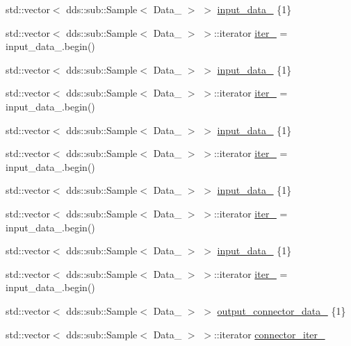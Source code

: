 \begin{DoxyCompactItemize}
\item 
std\+::vector$<$ dds\+::sub\+::\+Sample$<$ Data\+\_ $>$ $>$ \hyperlink{classFactory_a126e4ae222ac36e61cb29c93d7b375b3}{input\+\_\+data\+\_} \{1\}
\item 
std\+::vector$<$ dds\+::sub\+::\+Sample$<$ Data\+\_ $>$ $>$\+::iterator \hyperlink{classFactory_afe81300eda34ff9d60fc4f243b94534d}{iter\+\_} = input\+\_\+data\+\_.\+begin()
\item 
std\+::vector$<$ dds\+::sub\+::\+Sample$<$ Data\+\_ $>$ $>$ \hyperlink{classFactory_af23053102c7edeb254b91930647ed3e7}{input\+\_\+data\+\_} \{1\}
\item 
std\+::vector$<$ dds\+::sub\+::\+Sample$<$ Data\+\_ $>$ $>$\+::iterator \hyperlink{classFactory_a018adc4b2d04e5ed2f71dca5261a353e}{iter\+\_} = input\+\_\+data\+\_.\+begin()
\item 
std\+::vector$<$ dds\+::sub\+::\+Sample$<$ Data\+\_ $>$ $>$ \hyperlink{classFactory_af87769552e1c9b6b4f910eb992f23f9f}{input\+\_\+data\+\_} \{1\}
\item 
std\+::vector$<$ dds\+::sub\+::\+Sample$<$ Data\+\_ $>$ $>$\+::iterator \hyperlink{classFactory_adbd632440369980117032c2ba154eadb}{iter\+\_} = input\+\_\+data\+\_.\+begin()
\item 
std\+::vector$<$ dds\+::sub\+::\+Sample$<$ Data\+\_ $>$ $>$ \hyperlink{classFactory_a4bad31e0b189b22dfc4c1127b06040e0}{input\+\_\+data\+\_} \{1\}
\item 
std\+::vector$<$ dds\+::sub\+::\+Sample$<$ Data\+\_ $>$ $>$\+::iterator \hyperlink{classFactory_acd5df27b9212689ac21bba1db77eaf1f}{iter\+\_} = input\+\_\+data\+\_.\+begin()
\item 
std\+::vector$<$ dds\+::sub\+::\+Sample$<$ Data\+\_ $>$ $>$ \hyperlink{classFactory_a6aa6f19a951657809ad1663af4597670}{input\+\_\+data\+\_} \{1\}
\item 
std\+::vector$<$ dds\+::sub\+::\+Sample$<$ Data\+\_ $>$ $>$\+::iterator \hyperlink{classFactory_a6122d3e9df3241c7ce971675402efc25}{iter\+\_} = input\+\_\+data\+\_.\+begin()
\item 
std\+::vector$<$ dds\+::sub\+::\+Sample$<$ Data\+\_ $>$ $>$ \hyperlink{classFactory_a5b0446916aba039e366098c8db768b72}{output\+\_\+connector\+\_\+data\+\_} \{1\}
\item 
std\+::vector$<$ dds\+::sub\+::\+Sample$<$ Data\+\_ $>$ $>$\+::iterator \hyperlink{classFactory_a560460eae381287c085b613c5330dadd}{connector\+\_\+iter\+\_}
\item 

\end{DoxyCompactItemize}
